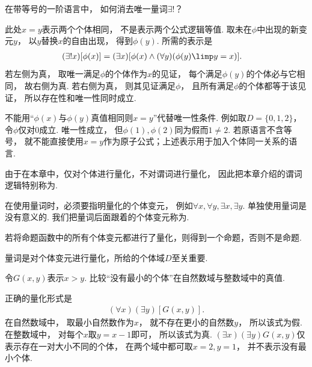 \begin{example}
    在带等号的一阶语言中，
    如何消去唯一量词\(\exists!\)？
    \begin{solution}
        此处\(x=y\)表示两个个体相同，
        不是表示两个公式逻辑等值.
        取未在\(\phi\)中出现的新变元\(y\)，
        以\(y\)替换\(x\)的自由出现，
        得到\(\phi(y)\).
        所需的表示是
        \begin{align*}
            (\exists!x)[\phi(x)] &= (\exists x)[\phi(x)\land(\forall y)(\phi(y)\limp y=x)].
        \end{align*}
        若左侧为真，
        取唯一满足\(\phi\)的个体作为\(x\)的见证，
        每个满足\(\phi(y)\)的个体必与它相同，
        故右侧为真.
        若右侧为真，
        则其见证满足\(\phi\)，
        且所有满足\(\phi\)的个体都等于该见证，
        所以存在性和唯一性同时成立.

        不能用“\(\phi(x)\)与\(\phi(y)\)真值相同则\(x=y\)”代替唯一性条件.
        例如取\(D=\{0,1,2\}\)，
        令\(\phi\)仅对\(0\)成立.
        唯一性成立，
        但\(\phi(1),\phi(2)\)同为假而\(1\ne2\).
        若原语言不含等号，
        就不能直接使用\(x=y\)作为原子公式；上述表示用于加入个体同一关系的语言.
    \end{solution}
\end{example}

由于在本章中，仅对个体进行量化，不对谓词进行量化，
因此把本章介绍的谓词逻辑特别称为.

在使用量词时，必须要指明量化的个体变元，
例如\(\forall x,\forall y,\exists x,\exists y\).
单独使用量词是没有意义的.
我们把量词后面跟着的个体变元称为.

若将命题函数中的所有个体变元都进行了量化，则得到一个命题，否则不是命题.

量词是对个体变元进行量化，所给的个体域\(D\)至关重要.
\begin{example}
    令\(G(x,y)\)表示\(x>y\).
    比较“没有最小的个体”在自然数域与整数域中的真值.
    \begin{solution}
        正确的量化形式是
        \begin{align*}
            (\forall x)(\exists y)[G(x,y)].
        \end{align*}
        在自然数域中，
        取最小自然数作为\(x\)，
        就不存在更小的自然数\(y\)，
        所以该式为假.
        在整数域中，
        对每个\(x\)取\(y=x-1\)即可，
        所以该式为真.
        \((\exists x)(\exists y)G(x,y)\)仅表示存在一对大小不同的个体，
        在两个域中都可取\(x=2,y=1\)，
        并不表示没有最小个体.
    \end{solution}
\end{example}

